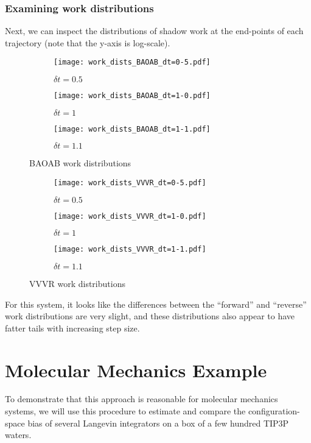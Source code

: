 \documentclass[11pt]{article}
\begin{document}
\subsubsection{Examining work distributions}
Next, we can inspect the distributions of shadow work at the end-points of each trajectory (note that the y-axis is log-scale).
\begin{figure}[h] %
    \centering
    \begin{subfigure}[b]{0.3\textwidth}
        \texttt{[image: work\_dists\_BAOAB\_dt=0-5.pdf]}
        \caption{$\delta t = 0.5$}
    \end{subfigure}
    \begin{subfigure}[b]{0.3\textwidth}
        \texttt{[image: work\_dists\_BAOAB\_dt=1-0.pdf]}
        \caption{$\delta t = 1$}
    \end{subfigure}
    \begin{subfigure}[b]{0.3\textwidth}
        \texttt{[image: work\_dists\_BAOAB\_dt=1-1.pdf]}
        \caption{$\delta t = 1.1$}
    \end{subfigure}
    \caption{BAOAB work distributions}
\end{figure}
\begin{figure}[h] %
    \centering
    \begin{subfigure}[b]{0.3\textwidth}
        \texttt{[image: work\_dists\_VVVR\_dt=0-5.pdf]}
        \caption{$\delta t = 0.5$}
    \end{subfigure}
    \begin{subfigure}[b]{0.3\textwidth}
        \texttt{[image: work\_dists\_VVVR\_dt=1-0.pdf]}
        \caption{$\delta t = 1$}
    \end{subfigure}
    \begin{subfigure}[b]{0.3\textwidth}
        \texttt{[image: work\_dists\_VVVR\_dt=1-1.pdf]}
        \caption{$\delta t = 1.1$}
    \end{subfigure}
    \caption{VVVR work distributions}
\end{figure}

For this system, it looks like the differences between the ``forward'' and ``reverse'' work distributions are very slight, and these distributions also appear to have fatter tails with increasing step size.

\section{Molecular Mechanics Example}
To demonstrate that this approach is reasonable for molecular mechanics systems, we will use this procedure to estimate and compare the configuration-space bias of several Langevin integrators on a box of a few hundred TIP3P waters.
\end{document}
